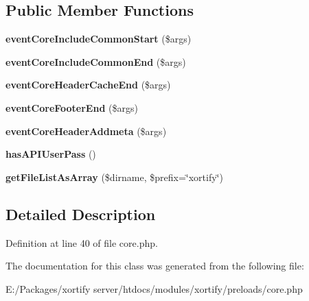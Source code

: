 \subsection*{Public Member Functions}
\begin{DoxyCompactItemize}
\item 
\hypertarget{class_xortify_core_preload_adc0c01862c2e4d5cacf6f2b07b20d9ba}{{\bfseries event\-Core\-Include\-Common\-Start} (\$args)}\label{class_xortify_core_preload_adc0c01862c2e4d5cacf6f2b07b20d9ba}

\item 
\hypertarget{class_xortify_core_preload_af8c197de09add249b14503f6a03434d1}{{\bfseries event\-Core\-Include\-Common\-End} (\$args)}\label{class_xortify_core_preload_af8c197de09add249b14503f6a03434d1}

\item 
\hypertarget{class_xortify_core_preload_a9aed269ae1d4073ed977a0847005f6eb}{{\bfseries event\-Core\-Header\-Cache\-End} (\$args)}\label{class_xortify_core_preload_a9aed269ae1d4073ed977a0847005f6eb}

\item 
\hypertarget{class_xortify_core_preload_a87b15888767bafa70ea17f96bf176c87}{{\bfseries event\-Core\-Footer\-End} (\$args)}\label{class_xortify_core_preload_a87b15888767bafa70ea17f96bf176c87}

\item 
\hypertarget{class_xortify_core_preload_a020c42b297e4e9c45e29abdefa79880e}{{\bfseries event\-Core\-Header\-Addmeta} (\$args)}\label{class_xortify_core_preload_a020c42b297e4e9c45e29abdefa79880e}

\item 
\hypertarget{class_xortify_core_preload_a2ed534bf0ce75f3f5ea332fa6b373549}{{\bfseries has\-A\-P\-I\-User\-Pass} ()}\label{class_xortify_core_preload_a2ed534bf0ce75f3f5ea332fa6b373549}

\item 
\hypertarget{class_xortify_core_preload_a5cfc1f473e16b0e23c573e888e374670}{{\bfseries get\-File\-List\-As\-Array} (\$dirname, \$prefix=\char`\"{}xortify\char`\"{})}\label{class_xortify_core_preload_a5cfc1f473e16b0e23c573e888e374670}

\end{DoxyCompactItemize}


\subsection{Detailed Description}


Definition at line 40 of file core.\-php.



The documentation for this class was generated from the following file\-:\begin{DoxyCompactItemize}
\item 
E\-:/\-Packages/xortify server/htdocs/modules/xortify/preloads/core.\-php\end{DoxyCompactItemize}
